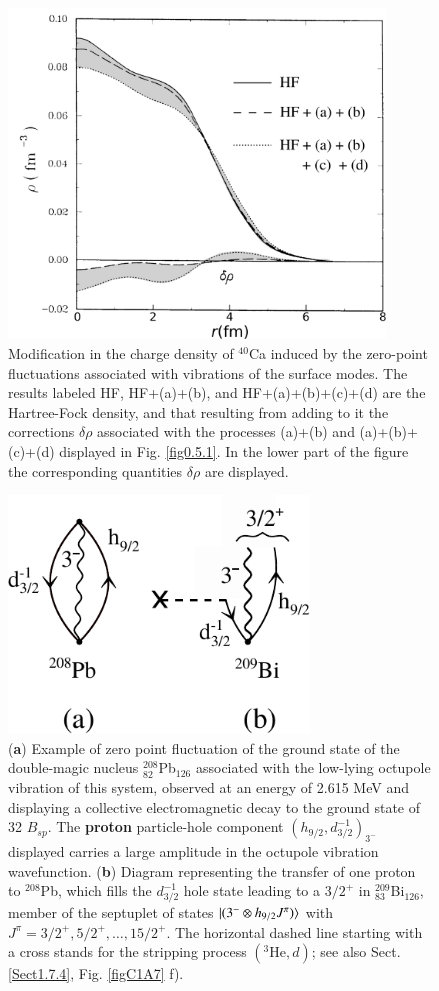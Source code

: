 \begin{figure}
	\centerline {
		\includegraphics*[width=10cm, angle=0.]{introduccion/figs/fig0_8_2}
	}
	\caption{Modification in the charge density of $^{40}$Ca induced by the zero-point fluctuations associated with vibrations of the surface modes. The results labeled HF, HF+(a)+(b), and HF+(a)+(b)+(c)+(d) are the Hartree-Fock density, and that resulting from adding to it the corrections $\delta\rho$ associated with the processes (a)+(b) and  (a)+(b)+(c)+(d)  displayed in Fig. \ref{fig0.5.1}. In the lower part of the figure the  corresponding quantities $\delta\rho$ are displayed.}
	\label{fig0.5.2}
\end{figure}
\begin{figure}
	\centerline {
		\includegraphics*[width=8cm, angle=0.]{introduccion/figs/fig0_5_3}
	}
	\caption{(\textbf{a}) Example of zero point fluctuation of the ground state of the double-magic nucleus $^{208}_{82}$Pb$_{126}$ associated with the low-lying octupole vibration of this system, observed at an energy of 2.615 MeV and displaying a collective electromagnetic decay to the ground state of 32 $B_{sp}$. The \textbf{proton} particle-hole component $(h_{9/2},d^{-1}_{3/2})_{3^-}$ displayed carries a large amplitude in the octupole vibration wavefunction. (\textbf{b}) Diagram representing the transfer of one proton to $^{208}$Pb, which fills the $d_{3/2}^{-1}$ hole state leading to a $3/2^+$ in $^{209}_{83}$Bi$_{126}$, member of the septuplet of states $|{(3^-\otimes h_{9/2}J^\pi)} \rangle$ with $J^\pi=3/2^+,5/2^+,\dots,15/2^+$. The horizontal dashed line starting with a cross stands for the stripping process $(^3\text{He},d)$; see also Sect. \ref{Sect1.7.4}, Fig. \ref{figC1A7} f).}
	\label{fig0.5.3}
\end{figure}




